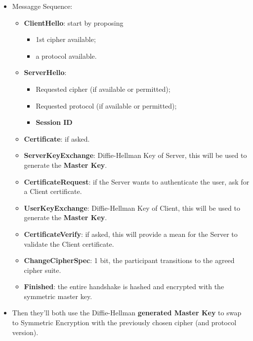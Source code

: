 \documentclass[9pt, letterpaper]{article}
\begin{document}
\begin{itemize}
\item Messagge Sequence:
	\begin{itemize}
	\item \textbf{ClientHello}: start by proposing
		\begin{itemize}
			\item 1st cipher available;
			\item a protocol available.
		\end{itemize}
	\item \textbf{ServerHello}:
		\begin{itemize}
			\item Requested cipher (if available or permitted);
			\item Requested protocol (if available or permitted);
			\item \textbf{Session ID}
		\end{itemize}
	\item \textbf{Certificate}: if asked.
	\item \textbf{ServerKeyExchange}: Diffie-Hellman Key of Server, this will be used to generate the \textbf{Master Key}.
	\item \textbf{CertificateRequest}: if the Server wants to authenticate the user, ask for a Client certificate.
	\item \textbf{UserKeyExchange}: Diffie-Hellman Key of Client, this will be used to generate the \textbf{Master Key}.
	\item \textbf{CertificateVerify}: if asked, this will provide a mean for the Server to validate the Client certificate.
	\item \textbf{ChangeCipherSpec}: 1 bit, the participant transitions to the agreed cipher suite.
	\item \textbf{Finished}: the entire handshake is hashed and encrypted with the symmetric master key.
	\end{itemize}
	\item Then they'll both use the Diffie-Hellman \textbf{generated Master Key} to swap to Symmetric Encryption with the previously chosen cipher (and protocol version).
\end{itemize}
\end{document}
